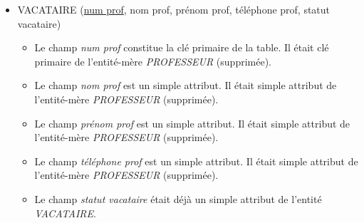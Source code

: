 \documentclass[a4paper]{article}
\newcommand{\relat}[1]{\textsc{#1}}
\newcommand{\attr}[1]{#1}
\newcommand{\prim}[1]{\uline{#1}}
\begin{document}
\begin{itemize}
  \item \relat{VACATAIRE} (\prim{num prof}, \attr{nom prof}, \attr{prénom prof}, \attr{téléphone prof}, \attr{statut vacataire})
  \begin{itemize}
    \item Le champ \emph{num prof} constitue la clé primaire de la table. Il était clé primaire de l'entité-mère \emph{PROFESSEUR} (supprimée).
    \item Le champ \emph{nom prof} est un simple attribut. Il était simple attribut de l'entité-mère \emph{PROFESSEUR} (supprimée).
    \item Le champ \emph{prénom prof} est un simple attribut. Il était simple attribut de l'entité-mère \emph{PROFESSEUR} (supprimée).
    \item Le champ \emph{téléphone prof} est un simple attribut. Il était simple attribut de l'entité-mère \emph{PROFESSEUR} (supprimée).
    \item Le champ \emph{statut vacataire} était déjà un simple attribut de l'entité \emph{VACATAIRE}.
  \end{itemize}

\end{itemize}
\end{document}
